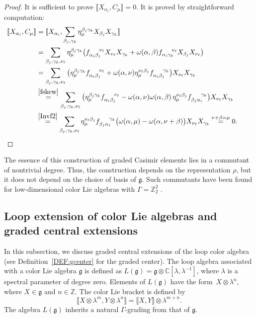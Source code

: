 \documentclass[pdftex]{sigma}
\numberwithin{equation}{section}
\theoremstyle{definition}
\def\nn{\notag}
\def\Z2{\mathbb{Z}_2^2}
\def\g{\mathfrak{g}}
\begin{document}
\begin{proof}
	It is sufficient to prove $ \llbracket X_{\alpha_i}, C_{\mu} \rrbracket = 0. $
	It is proved by straightforward computation:
	\begin{align*}
		\llbracket X_{\alpha_i}, C_{\mu} \rrbracket &= \llbracket X_{\alpha_i}, \sum_{\beta_j,\gamma_k} \eta_{\mu}^{\beta_j \gamma_k} X_{\beta_j} X_{\gamma_k} \rrbracket
		\nn\\
		&= \sum_{\beta_j,\gamma_k,\nu_{\ell}} \eta_{\mu}^{\beta_j \gamma_k}
		\big( f_{\alpha_i \beta_j}^{\quad \ \nu_{\ell}} X_{\nu_{\ell}} X_{\gamma_k} + \omega(\alpha,\beta) f_{\alpha_i \gamma_k}^{\quad\ \nu_{\ell}} X_{\beta_j} X_{\nu_{\ell}} \big)
		\nn\\
		&=
		\sum_{\beta_j,\gamma_k,\nu_{\ell}}
		\big( \eta_{\mu}^{\beta_j \gamma_k} f_{\alpha_i \beta_j}^{\quad \ \nu_{\ell}} + \omega(\alpha,\nu) \eta_{\mu}^{\nu_{\ell} \beta_j} f_{\alpha_i \beta_j}^{\quad \ \gamma_k} \big)
		X_{\nu_{\ell}} X_{\gamma_k}
		\nn \\
		&\stackrel{\eqref{fskew}}{=}
		\sum_{\beta_j,\gamma_k,\nu_{\ell}}
		\big( \eta_{\mu}^{\beta_j \gamma_k} f_{\alpha_i \beta_j}^{\quad \ \nu_{\ell}} - \omega(\alpha,\nu) \omega(\alpha,\beta)\, \eta_{\mu}^{\nu_{\ell} \beta_j} f_{\beta_j \alpha_i}^{\quad \ \gamma_k} \big)
		X_{\nu_{\ell}} X_{\gamma_k}
		\nn\\
		&\stackrel{\eqref{Invf2}}{=}
		\sum_{\beta_j,\gamma_k,\nu_{\ell}} \eta_{\mu}^{\nu_{\ell} \beta_j} f_{\beta_j \alpha_i}^{\quad \ \gamma_k} \big( \omega(\alpha,\mu) - \omega(\alpha,\nu+\beta) \big)
		X_{\nu_{\ell}} X_{\gamma_k}
		 \stackrel{\nu+\beta=\mu}{=} 0.\tag*{\qed}
	\end{align*}\renewcommand{\qed}{}
\end{proof}

The essence of this construction of graded Casimir elements lies in a commutant of nontrivial degree.
Thus, the construction depends on the representation $\rho$, but it does not depend on the choice of basis of $\g$.
Such commutants have been found for low-dimensional color Lie algebras with $\Gamma = \Z2$ \cite{AFITTsuper,AIKTTslint,AiSe}.

\subsection{Loop extension of color Lie algebras and graded central extensions}

In this subsection, we discuss graded central extensions of the loop color algebra (see Definition~\ref{DEF:gcenter} for the graded center).
The loop algebra associated with a color Lie algebra $\g$ is defined as $ L(\g) = \g \otimes \mathbb{C}[\lambda,\lambda^{-1}]$, where $\lambda$ is a spectral parameter of degree zero.
Elements of $L(\g)$ have the form~$ X \otimes \lambda^n$, where $ X \in \g$ and $ n \in \mathbb{Z}$. The color Lie bracket is defined by
\begin{equation*}
	\llbracket X\otimes \lambda^m, Y \otimes \lambda^n \rrbracket = \llbracket X, Y \rrbracket \otimes \lambda^{m+n}.
\end{equation*}
The algebra $L(\g)$ inherits a natural $\Gamma$-grading from that of $\g$.
\end{document}
